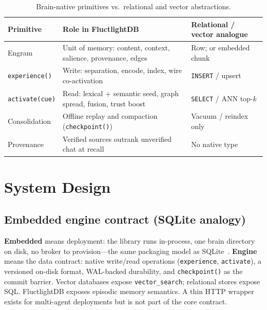 \documentclass[11pt]{article}
\begin{document}
\begin{table}[h]
\centering
\caption{Brain-native primitives vs.\ relational and vector abstractions.}
\begin{tabular}{p{2.2cm}p{4.2cm}p{4.8cm}}
\toprule
\textbf{Primitive} & \textbf{Role in FluctlightDB} & \textbf{Relational / vector analogue} \\
\midrule
Engram & Unit of memory: content, context, salience, provenance, edges & Row; or embedded chunk \\
\texttt{experience()} & Write: separation, encode, index, wire co-activation & \texttt{INSERT} / upsert \\
\texttt{activate(cue)} & Read: lexical + semantic seed, graph spread, fusion, trust boost & \texttt{SELECT} / ANN top-$k$ \\
Consolidation & Offline replay and compaction (\texttt{checkpoint()}) & Vacuum / reindex only \\
Provenance & Verified sources outrank unverified chat at recall & No native type \\
\bottomrule
\end{tabular}
\end{table}

\section{System Design}
\label{sec:design}
\subsection{Embedded engine contract (SQLite analogy)}
\textbf{Embedded} means deployment: the library runs in-process, one brain directory
on disk, no broker to provision---the same packaging model as SQLite~\cite{sqlite2024}.
\textbf{Engine} means the data contract: native write/read operations
(\texttt{experience}, \texttt{activate}), a versioned on-disk format, WAL-backed
durability, and \texttt{checkpoint()} as the commit barrier. Vector databases expose
\texttt{vector\_search}; relational stores expose SQL. FluctlightDB exposes episodic
memory semantics. A thin HTTP wrapper exists for multi-agent deployments but is not
part of the core contract.
\end{document}
